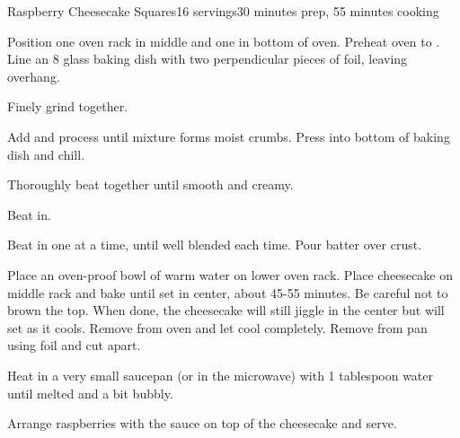 \documentclass[../Cookbook.tex]{subfiles}
\begin{document}
\begin{recipe}{Raspberry Cheesecake Squares}{16 servings}{30 minutes prep, 55 minutes cooking}

Position one oven rack in middle and one in bottom of oven. Preheat oven to . Line an 8 glass baking dish with two perpendicular pieces of foil, leaving overhang.

Finely grind together.

Add and process until mixture forms moist crumbs. Press into bottom of baking dish and chill.

Thoroughly beat together until smooth and creamy.

Beat in.

Beat in one at a time, until well blended each time. Pour batter over crust.

Place an oven-proof bowl of warm water on lower oven rack. Place cheesecake on middle rack and bake until set in center, about 45-55 minutes. Be careful not to brown the top.
When done, the cheesecake will still jiggle in the center but will set as it cools.
Remove from oven and let cool completely. Remove from pan using foil and cut apart.

Heat in a very small saucepan (or in the microwave) with 1 tablespoon water until melted and a bit bubbly.

Arrange raspberries with the sauce on top of the cheesecake and serve.

\end{recipe}
\end{document}

